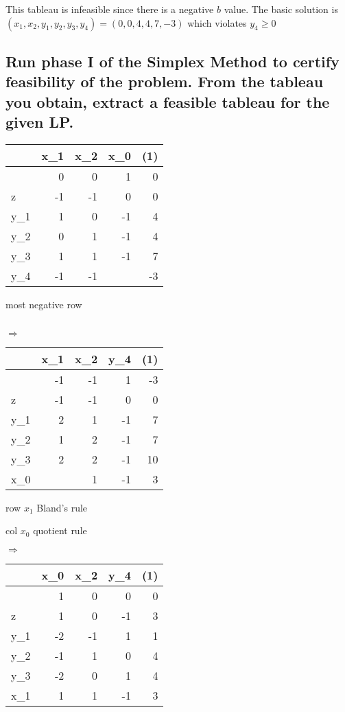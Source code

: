 \documentclass[12pt, a4]{article}
\begin{document}
	This tableau is infeasible since there is a negative $b$ value. The basic solution is $(x_1,x_2,y_1,y_2,y_3,y_4) = (0,0,4,4,7,-3)$ which violates $y_4 \geq 0$
	
\subsection{Run phase I of the Simplex Method to certify feasibility of the problem. From the tableau you obtain, extract a feasible tableau for the given LP.}{\label{sec:1c}}
\begin{minipage}{.3\textwidth}
	

\begin{tabular}{L|RRR||R}
	& x_1 & x_2 & x_0 & (1) \\
	\hline
	 & 0 & 0 & 1 & 0 \\
	\hline
	z & -1 & -1 & 0 &0 \\
	\hline
	y_1 & 1 & 0 & -1 &4 \\
	y_2 & 0 & 1 & -1 &4 \\
	y_3 & 1 & 1 & -1 &7 \\
	y_4 & -1 & -1 &  & -3 \\
\end{tabular}

most negative row 

$\quad$
\end{minipage}
$\Rightarrow$
\begin{minipage}{.3\textwidth}

	\begin{tabular}{L|RRR||R}
		& x_1 & x_2 & y_4 & (1)  \\
		\hline
		 & -1 & -1 & 1 & -3 \\
		\hline
		z & -1 & -1 & 0 &0 \\
		\hline
		y_1 & 2 & 1 & -1 &7 \\
		y_2 & 1 & 2 & -1 &7 \\
		y_3 & 2 & 2 & -1 &10 \\
		x_0 &  & 1 & -1 & 3 \\
	\end{tabular}

row $x_1$ Bland's rule

col $x_0$ quotient rule

\end{minipage}
$\Rightarrow$
\begin{minipage}{.3\textwidth}
	\begin{tabular}{L|RRR||R}
		& x_0 & x_2 & y_4 & (1)  \\
		\hline
		 & 1 & 0 & 0 & 0 \\
		\hline
		z & 1 & 0 & -1    & 3 \\
		\hline
		y_1 & -2 &-1 & 1 & 1 \\
		y_2 & -1 & 1 & 0 & 4 \\
		y_3 & -2 & 0 & 1 & 4 \\
		x_1 & 1  & 1 &-1 & 3 \\
	\end{tabular}

$\quad$

$\quad$

$\quad$
\end{minipage}
\end{document}
